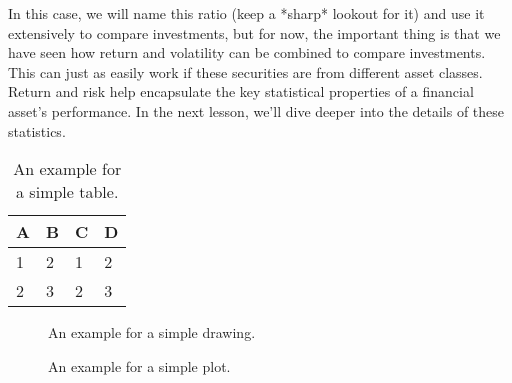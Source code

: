 In this case, we will name this ratio (keep a *sharp* lookout for it) and use it extensively to compare investments, but for now, the important thing is that we have seen how return and volatility can be combined to compare investments. This can just as easily work if these securities are from different asset classes. Return and risk help encapsulate the key statistical properties of a financial asset's performance. In the next lesson, we’ll dive deeper into the details of these statistics.
\begin{table}[htpb]
  \caption[Example table]{An example for a simple table.}\label{tab:sample}
  \centering
  \begin{tabular}{l l l l}
    \toprule
      A & B & C & D \\
    \midrule
      1 & 2 & 1 & 2 \\
      2 & 3 & 2 & 3 \\
    \bottomrule
  \end{tabular}
\end{table}

\begin{figure}[htpb]
  \centering
  \caption[Example drawing]{An example for a simple drawing.}\label{fig:sample-drawing}
\end{figure}

\begin{figure}[htpb]
  \centering

  \exampleA
  \exampleB
  \caption[Example plot]{An example for a simple plot.}\label{fig:sample-plot}
\end{figure}

